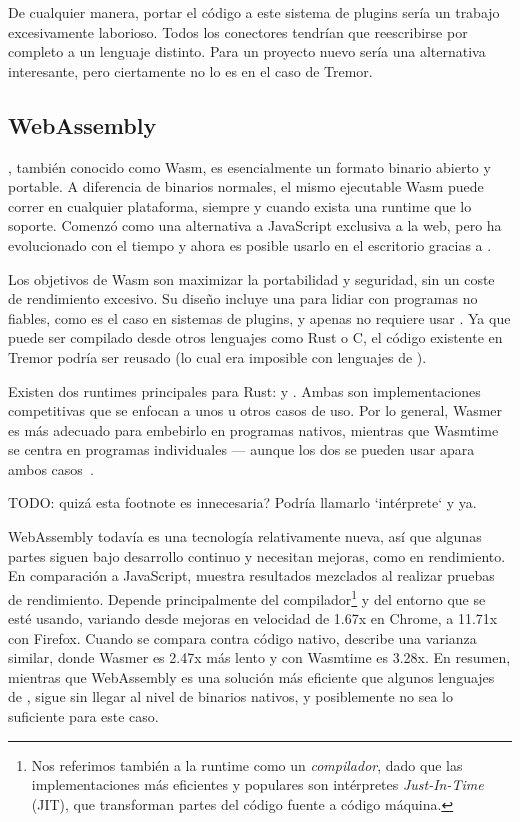 De cualquier manera, portar el código a este sistema de plugins sería un trabajo
excesivamente laborioso. Todos los conectores tendrían que reescribirse por
completo a un lenguaje distinto. Para un proyecto nuevo sería una alternativa
interesante, pero ciertamente no lo es en el caso de Tremor.

\subsection{WebAssembly}

\textcite{wasm}, también conocido como Wasm, es esencialmente un formato binario
abierto y portable. A diferencia de binarios normales, el mismo ejecutable Wasm
puede correr en cualquier plataforma, siempre y cuando exista una runtime que lo
soporte. Comenzó como una alternativa a JavaScript exclusiva a la web, pero ha
evolucionado con el tiempo y ahora es posible usarlo en el escritorio gracias a
\textcite{wasi}.

Los objetivos de Wasm son maximizar la portabilidad y seguridad, sin un coste de
rendimiento excesivo. Su diseño incluye una \sandbox para lidiar con programas
no fiables, como es el caso en sistemas de plugins, y apenas no requiere usar
\unsafe. Ya que puede ser compilado desde otros lenguajes como Rust o C, el
código existente en Tremor podría ser reusado (lo cual era imposible con
lenguajes de \scripting).

Existen dos runtimes principales para Rust: \textcite{wasmer} y
\textcite{wasmtime}. Ambas son implementaciones competitivas que se enfocan a
unos u otros casos de uso. Por lo general, Wasmer es más adecuado para embebirlo
en programas nativos, mientras que Wasmtime se centra en programas individuales
--- aunque los dos se pueden usar apara ambos casos~\cite{wasmwikiusage}.

TODO: quizá esta footnote es innecesaria? Podría llamarlo `intérprete` y ya.

WebAssembly todavía es una tecnología relativamente nueva, así que algunas
partes siguen bajo desarrollo continuo y necesitan mejoras, como en rendimiento.
En comparación a JavaScript, \textcite{jangda2019not} muestra resultados
mezclados al realizar pruebas de rendimiento. Depende principalmente del
compilador\footnote{Nos referimos también a la runtime como un
\emph{compilador}, dado que las implementaciones más eficientes y populares son
intérpretes \emph{Just-In-Time} (JIT), que transforman partes del código fuente
a código máquina.} y del entorno que se esté usando, variando desde mejoras en
velocidad de 1.67x en Chrome, a 11.71x con Firefox. Cuando se compara contra
código nativo, \textcite{libsodiumwasmperf} describe una varianza similar, donde
Wasmer es 2.47x más lento y con Wasmtime es 3.28x. En resumen, mientras que
WebAssembly es una solución más eficiente que algunos lenguajes de \scripting,
sigue sin llegar al nivel de binarios nativos, y posiblemente no sea lo
suficiente para este caso.

